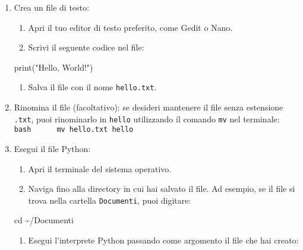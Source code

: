 \documentclass[
  letterpaper,
]{scrbook}
\newenvironment{Shaded}{\begin{snugshade}}{\end{snugshade}}
\newcommand{\BuiltInTok}[1]{\textcolor[rgb]{0.00,0.23,0.31}{#1}}
\newcommand{\NormalTok}[1]{\textcolor[rgb]{0.00,0.23,0.31}{#1}}
\newcommand{\StringTok}[1]{\textcolor[rgb]{0.13,0.47,0.30}{#1}}
\providecommand{\tightlist}{%
  \setlength{\itemsep}{0pt}\setlength{\parskip}{0pt}}\usepackage{longtable,booktabs,array}
\begin{document}
\begin{enumerate}
\def\labelenumi{\arabic{enumi}.}
\item
  Crea un file di testo:

  \begin{enumerate}
  \def\labelenumii{\arabic{enumii}.}
  \tightlist
  \item
    Apri il tuo editor di testo preferito, come Gedit o Nano.
  \item
    Scrivi il seguente codice nel file:
  \end{enumerate}

\begin{Shaded}
\begin{Highlighting}[]
\BuiltInTok{print}\NormalTok{(}\StringTok{"Hello, World!"}\NormalTok{)}
\end{Highlighting}
\end{Shaded}

  \begin{enumerate}
  \def\labelenumii{\arabic{enumii}.}
  \setcounter{enumii}{2}
  \tightlist
  \item
    Salva il file con il nome \texttt{hello.txt}.
  \end{enumerate}
\item
  Rinomina il file (facoltativo): se desideri mantenere il file senza
  estensione \texttt{.txt}, puoi rinominarlo in \texttt{hello}
  utilizzando il comando \texttt{mv} nel terminale:
  \texttt{bash\ \ \ \ \ \ mv\ hello.txt\ hello}
\item
  Esegui il file Python:

  \begin{enumerate}
  \def\labelenumii{\arabic{enumii}.}
  \tightlist
  \item
    Apri il terminale del sistema operativo.
  \item
    Naviga fino alla directory in cui hai salvato il file. Ad esempio,
    se il file si trova nella cartella \texttt{Documenti}, puoi
    digitare:
  \end{enumerate}

\begin{Shaded}
\begin{Highlighting}[]
\BuiltInTok{cd}\NormalTok{ \textasciitilde{}/Documenti}
\end{Highlighting}
\end{Shaded}

  \begin{enumerate}
  \def\labelenumii{\arabic{enumii}.}
  \setcounter{enumii}{2}
  \tightlist
  \item
    Esegui l'interprete Python passando come argomento il file che hai
    creato:
  \end{enumerate}


\end{enumerate}
\end{document}
